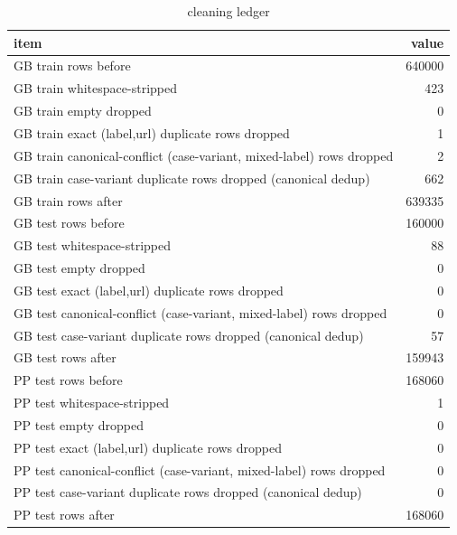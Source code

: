 \begin{table}[htbp]
\caption{cleaning ledger}
\label{tab:cleaning_ledger}
\begin{tabular}{lr}
\toprule
item & value \\
\midrule
GB train rows before & 640000 \\
GB train whitespace-stripped & 423 \\
GB train empty dropped & 0 \\
GB train exact (label,url) duplicate rows dropped & 1 \\
GB train canonical-conflict (case-variant, mixed-label) rows dropped & 2 \\
GB train case-variant duplicate rows dropped (canonical dedup) & 662 \\
GB train rows after & 639335 \\
GB test rows before & 160000 \\
GB test whitespace-stripped & 88 \\
GB test empty dropped & 0 \\
GB test exact (label,url) duplicate rows dropped & 0 \\
GB test canonical-conflict (case-variant, mixed-label) rows dropped & 0 \\
GB test case-variant duplicate rows dropped (canonical dedup) & 57 \\
GB test rows after & 159943 \\
PP test rows before & 168060 \\
PP test whitespace-stripped & 1 \\
PP test empty dropped & 0 \\
PP test exact (label,url) duplicate rows dropped & 0 \\
PP test canonical-conflict (case-variant, mixed-label) rows dropped & 0 \\
PP test case-variant duplicate rows dropped (canonical dedup) & 0 \\
PP test rows after & 168060 \\
\bottomrule
\end{tabular}
\end{table}

